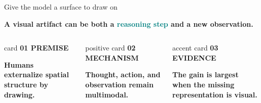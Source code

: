 \documentclass[10pt,aspectratio=169]{beamer}
\newcommand{\eyebrow}[1]{%
  {\color{Teal}\bfseries\fontsize{8}{9.5}\selectfont\MakeUppercase{#1}}%
}
\begin{document}
\begin{frame}{Give the model a surface to draw on}
  \vspace{0.25cm}
  \begin{center}
    {\fontsize{21}{25}\selectfont\bfseries
     A visual artifact can be both a \textcolor{Teal}{reasoning step}
     and a \textcolor{Saffron!90!black}{new observation}.}
  \end{center}
  \vspace{0.58cm}

  \begin{columns}[T,onlytextwidth]
      \begin{beamercolorbox}[rounded=true,wd=\linewidth,ht=2.35cm,dp=0.20cm,sep=0.27cm]{card}
        \eyebrow{01 \; Premise}\par\vspace{0.18cm}
        {\bfseries Humans externalize spatial structure by drawing.}\par
        \vspace{0.12cm}{\small Why should multimodal LMs reason only in text?}
      \end{beamercolorbox}
      \begin{beamercolorbox}[rounded=true,wd=\linewidth,ht=2.35cm,dp=0.20cm,sep=0.27cm]{positive card}
        \eyebrow{02 \; Mechanism}\par\vspace{0.18cm}
        {\bfseries Thought, action, and observation remain multimodal.}\par
        \vspace{0.12cm}{\small The model plans, draws, inspects, and adapts.}
      \end{beamercolorbox}
      \begin{beamercolorbox}[rounded=true,wd=\linewidth,ht=2.35cm,dp=0.20cm,sep=0.27cm]{accent card}
        \eyebrow{03 \; Evidence}\par\vspace{0.18cm}
        {\bfseries The gain is largest when the missing representation is visual.}\par
        \vspace{0.12cm}{\small Math, search, depth, and correspondence all improve.}
      \end{beamercolorbox}
  \end{columns}
\end{frame}
\end{document}
